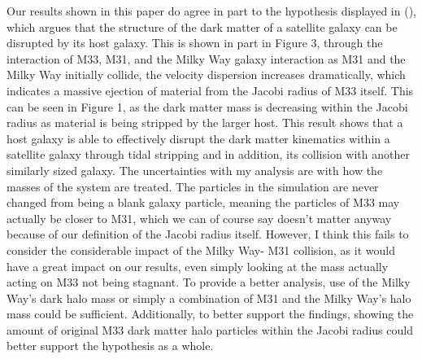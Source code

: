 \documentclass{aastex7}
\begin{document}
\vspace{2 em}
Our results shown in this paper do agree in part to the hypothesis displayed in (\cite{Wolf_2010}), which argues that the structure of the dark matter of a satellite galaxy can be disrupted by its host galaxy. This is shown in part in Figure 3, through the interaction of M33, M31, and the Milky Way galaxy interaction as M31 and the Milky Way initially collide, the velocity dispersion increases dramatically, which indicates a massive ejection of material from the Jacobi radius of M33 itself. This can be seen in Figure 1, as the dark matter mass is decreasing within the Jacobi radius as material is being stripped by the larger host. This result shows that a host galaxy is able to effectively disrupt the dark matter kinematics within a satellite galaxy through tidal stripping and in addition, its collision with another similarly sized galaxy.
\vspace{1 em}
The uncertainties with my analysis are with how the masses of the system are treated. The particles in the simulation are never changed from being a blank galaxy particle, meaning the particles of M33 may actually be closer to M31, which we can of course say doesn't matter anyway because of our definition of the Jacobi radius itself. However, I think this fails to consider the considerable impact of the Milky Way- M31 collision, as it would have a great impact on our results, even simply looking at the mass actually acting on M33 not being stagnant. To provide a better analysis, use of the Milky Way's dark halo mass or simply a combination of M31 and the Milky Way's halo mass could be sufficient. Additionally, to better support the findings, showing the amount of original M33 dark matter halo particles within the Jacobi radius could better support the hypothesis as a whole.


{}

\end{document}
